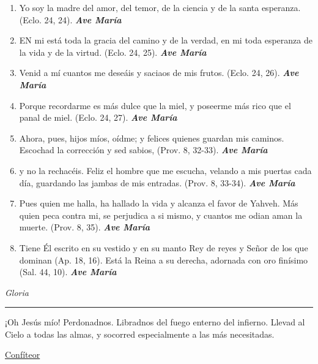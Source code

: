 \documentclass[a4paper,11pt, oneside]{report}
\begin{document}
{{\begin{enumerate}
        \item Yo soy la madre del amor, del temor, de la ciencia y de la santa esperanza. (Eclo. 24, 24). \textbf{\textit{Ave María}}

        \item EN mi está toda la gracia del camino y de la verdad, en mi toda esperanza de la vida y de la virtud. (Eclo. 24, 25). \textbf{\textit{Ave María}}

        \item Venid a mí cuantos me deseáis y saciaos de mis frutos. (Eclo. 24, 26). \textbf{\textit{Ave María}}

        \item Porque recordarme es más dulce que la miel, y poseerme más rico que el panal de miel. (Eclo. 24, 27). \textbf{\textit{Ave María}}

        \item Ahora, pues, hijos míos, oídme; y felices quienes guardan mis caminos. Escochad la corrección y sed sabios, (Prov. 8, 32-33). \textbf{\textit{Ave María}}

        \item y no la rechacéis. Feliz el hombre que me escucha, velando a mis puertas cada día,
        guardando las jambas de mis entradas. (Prov. 8, 33-34). \textbf{\textit{Ave María}}

        \item Pues quien me halla, ha hallado la vida y alcanza el favor de Yahveh. Más quien peca contra mi, se perjudica a si mismo,
        y cuantos me odian aman la muerte. (Prov. 8, 35). \textbf{\textit{Ave María}}

        \item Tiene Él escrito en su vestido y en su manto Rey de reyes y Señor de los que dominan (Ap. 18, 16).
        Está la Reina a su derecha, adornada con oro finísimo (Sal. 44, 10). \textbf{\textit{Ave María}}
      \end{enumerate}      

      \indent\textit{Gloria} \par      

      \begin{center}\rule{1\linewidth}{\linethickness}\end{center}      

      \medskip
      \hypertarget{finalCoronacion}{¡Oh Jesús mío! Perdonadnos. Libradnos del fuego enterno del infierno. Llevad al Cielo a todas las almas, y socorred especialmente a las más 
      necesitadas.}
    }

  \par\bigskip
  \hyperlink{sec:confiteor}{Confíteor}
}
      
\end{document}
